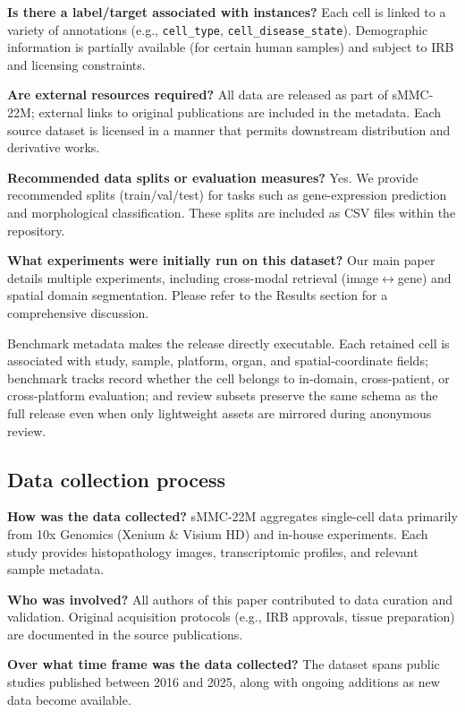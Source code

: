\documentclass[sigconf,review]{acmart}
\newcommand{\dataset}{sMMC-22M\xspace}
\newcommand{\datasheetq}[1]{\par\noindent\textbf{#1}\enspace}
\begin{document}
\datasheetq{Is there a label/target associated with instances?}
Each cell is linked to a variety of annotations (e.g., \texttt{cell\_type}, \texttt{cell\_disease\_state}). Demographic information is partially available (for certain human samples) and subject to IRB and licensing constraints.

\datasheetq{Are external resources required?}
All data are released as part of \dataset; external links to original publications are included in the metadata. Each source dataset is licensed in a manner that permits downstream distribution and derivative works.

\datasheetq{Recommended data splits or evaluation measures?}
Yes. We provide recommended splits (train/val/test) for tasks such as gene-expression prediction and morphological classification. These splits are included as CSV files within the repository.

\datasheetq{What experiments were initially run on this dataset?}
Our main paper details multiple experiments, including cross-modal retrieval (image$\leftrightarrow$gene) and spatial domain segmentation. Please refer to the Results section for a comprehensive discussion.

Benchmark metadata makes the release directly executable. Each retained cell is associated with study, sample, platform, organ, and spatial-coordinate fields; benchmark tracks record whether the cell belongs to in-domain, cross-patient, or cross-platform evaluation; and review subsets preserve the same schema as the full release even when only lightweight assets are mirrored during anonymous review.


\subsection{Data collection process}
\datasheetq{How was the data collected?}
\dataset aggregates single-cell data primarily from 10x Genomics (Xenium \& Visium HD) and in-house experiments. Each study provides histopathology images, transcriptomic profiles, and relevant sample metadata.

\datasheetq{Who was involved?}
All authors of this paper contributed to data curation and validation. Original acquisition protocols (e.g., IRB approvals, tissue preparation) are documented in the source publications.

\datasheetq{Over what time frame was the data collected?}
The dataset spans public studies published between 2016 and 2025, along with ongoing additions as new data become available.
\end{document}
